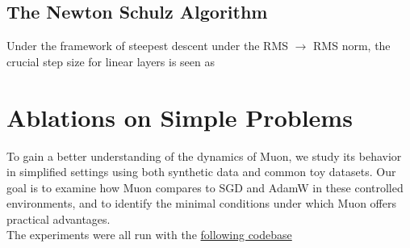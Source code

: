 \documentclass[12pt]{book}
\begin{document}
\subsection{The Newton Schulz Algorithm}
Under the framework of steepest descent under the RMS $\to$ RMS norm, the crucial step size for linear layers is seen as 


\section{Ablations on Simple Problems}
To gain a better understanding of the dynamics of Muon, we study its behavior in simplified settings using both synthetic data and common toy datasets. Our goal is to examine how Muon compares to SGD and AdamW in these controlled environments, and to identify the minimal conditions under which Muon offers practical advantages.
\\
The experiments were all run with the \href{https://github.com/sam-laing/optimizer_playground/tree/main}{following codebase}
\end{document}
